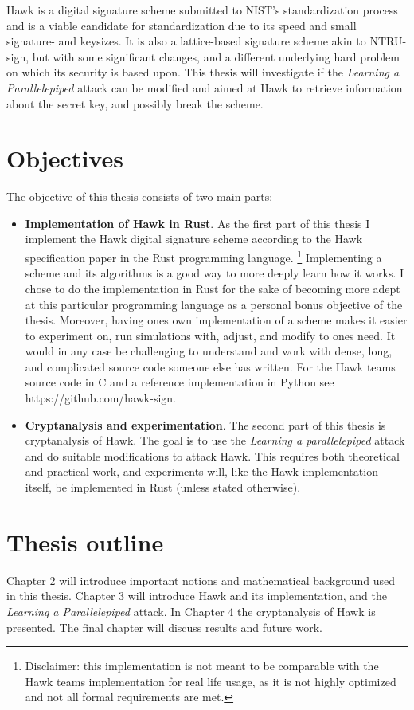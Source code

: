 Hawk \cite{HawkSpec24} is a digital signature scheme submitted to NIST's standardization process and is a viable candidate for standardization
due to its speed and small signature- and keysizes. It is also a lattice-based signature scheme akin to NTRU-sign, but with some significant changes, and a different underlying hard problem on which its security is based upon. 
This thesis will investigate if the \textit{Learning a Parallelepiped} attack can be modified and aimed at Hawk to retrieve information about the secret key, and possibly break the scheme.

\section{Objectives}
The objective of this thesis consists of two main parts:
\begin{itemize}
    \item \textbf{Implementation of Hawk in Rust}. As the first part of this thesis I implement the Hawk digital signature scheme according to the Hawk specification paper \cite{HawkSpec24} in the Rust programming language.
        \footnote{Disclaimer: this implementation is not meant to be comparable with the Hawk teams implementation for real life usage, as it is not highly optimized and not all formal requirements are met.}
    Implementing a scheme and its algorithms is a good way to more deeply learn how it works. I chose to do the implementation in Rust for the sake of becoming more adept at this particular programming language as a personal bonus objective of the thesis.
    Moreover, having ones own implementation of a scheme makes it easier to experiment on, run simulations with, adjust, and modify to ones need. It would in any case be challenging to understand and work with dense, long, 
    and complicated source code someone else has written. For the Hawk teams source code in C and a reference implementation in Python see https://github.com/hawk-sign.


\item \textbf{Cryptanalysis and experimentation}. The second part of this thesis is cryptanalysis of Hawk. The goal is to use the \textit{Learning a parallelepiped} attack and do suitable modifications to attack Hawk. 
    This requires both theoretical and practical work, and experiments will, like the Hawk implementation itself, be implemented in Rust (unless stated otherwise).
\end{itemize}
\section{Thesis outline}
Chapter 2 will introduce important notions and mathematical background used in this thesis. Chapter 3 will introduce Hawk and its implementation, and the \textit{Learning a Parallelepiped} attack.
In Chapter 4 the cryptanalysis of Hawk is presented. The final chapter will discuss results and future work.

